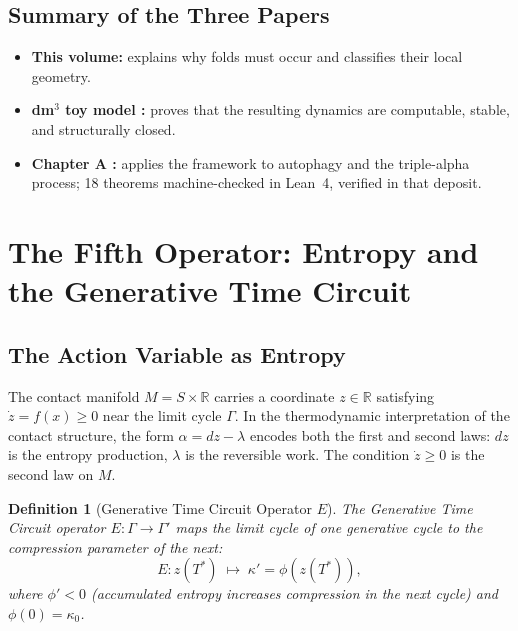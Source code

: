 \documentclass[14pt,a4paper]{extarticle}
\newtheorem{definition}{Definition}[section]
\begin{document}
\subsection{Summary of the Three Papers}

\begin{itemize}[leftmargin=2em]
  \item \textbf{This volume:} explains why folds must occur and
    classifies their local geometry.
  \item \textbf{dm$^3$ toy model \cite{Grossi2026_SIAM}:} proves that
    the resulting dynamics are computable, stable, and structurally
    closed.
  \item \textbf{Chapter A \cite{Grossi2026_ChA}:} applies the
    framework to autophagy and the triple-alpha process; 18 theorems
    machine-checked in Lean~4, verified in that deposit.
\end{itemize}

\section{The Fifth Operator: Entropy and the Generative Time Circuit}
\label{sec:entropy}

\subsection{The Action Variable as Entropy}

The contact manifold $M = S \times \mathbb{R}$ carries a coordinate
$z \in \mathbb{R}$ satisfying $\dot{z} = f(x) \geq 0$ near the limit
cycle $\Gamma$.
In the thermodynamic interpretation of the contact structure, the form
$\alpha = dz - \lambda$ encodes both the first and second laws: $dz$
is the entropy production, $\lambda$ is the reversible work.
The condition $\dot{z} \geq 0$ is the second law on $M$.

\begin{definition}[Generative Time Circuit Operator $E$]
\label{def:E}
The \emph{Generative Time Circuit} operator
$E : \Gamma \to \Gamma'$ maps the limit cycle of one generative
cycle to the compression parameter of the next:
\[
  E : z(T^*) \;\mapsto\; \kappa' = \phi(z(T^*)),
\]
where $\phi' < 0$ (accumulated entropy increases compression in the
next cycle) and $\phi(0) = \kappa_0$.
\end{definition}
\end{document}
